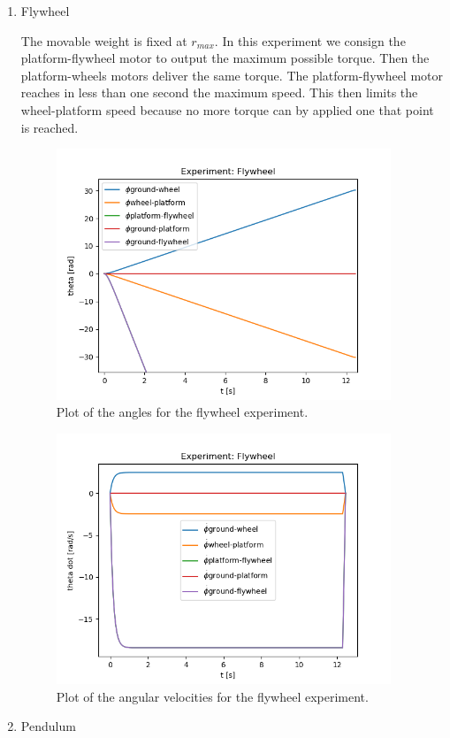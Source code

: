 \begin{enumerate}
	\item Flywheel
	
		The movable weight is fixed at $r_{max}$. In this experiment we consign the platform-flywheel motor to 
		output the maximum possible torque. Then the platform-wheels motors deliver
		the same torque. The platform-flywheel motor reaches in less than one second
		the maximum speed. This then limits the wheel-platform speed because no
		more torque can by applied one that point is reached.
	      \begin{figure}[H]
		      \centering
		      \includegraphics[width=10cm]{img/lagrange_5/flywheel_q.png}
		      \caption{Plot of the angles for the flywheel experiment.}
		      \label{fig:Simulation flywheel q}
	      \end{figure}


	      \begin{figure}[H]
		      \centering
		      \includegraphics[width=10cm]{img/lagrange_5/flywheel_q_dot.png}
		      \caption{Plot of the angular velocities for the flywheel experiment.}
		      \label{fig:Simulation flywheel q dot}
	      \end{figure}
	\item Pendulum
	

\end{enumerate}
